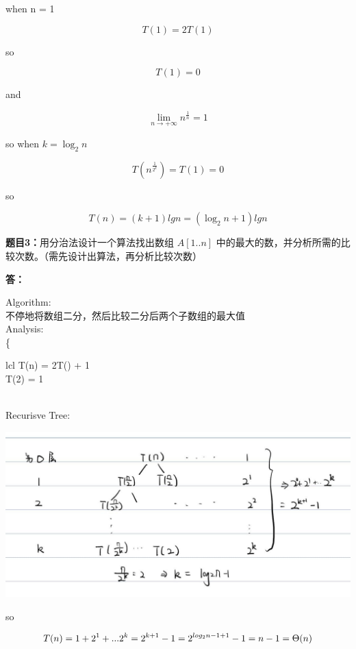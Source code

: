 \documentclass[12pt,a4paper]{article}
\begin{document}
\begin{CJK*}{UTF8}{gbsn}
when n = 1

$$T(1) = 2T(1)$$

so 

$$T(1) = 0$$

and 

$$\lim_{n \to +\infty} n^{\frac{1}{n}} = 1$$

so when $k = \log_2n$

$$T(n^{\frac{1}{2^k}}) = T(1) = 0$$

so 

$$T(n) = (k+1)lgn = (\log_2n+1)lgn$$

\vspace{10pt}
\noindent
{\bf 题目3：}用分治法设计一个算法找出数组 $A[1..n]$ 中的最大的数，并分析所需的比较次数。（需先设计出算法，再分析比较次数）

\vspace{5pt}
\noindent
{\bf 答：}

Algorithm:\\

不停地将数组二分，然后比较二分后两个子数组的最大值\\

Analysis:\\

\left\{\begin{array}{lcl}
		T(n) = 2T() + 1\\
		T(2) = 1
	\end{array}\right\\

Recurisve Tree:

\includegraphics[width=15cm]{pic_hw3.jpg}

so

$$
T(n) = 1 + 2^1 + ... 2^k = 2^{k+1} -1\\
= 2^{log_2n - 1 + 1} -1 = n -1 = \Theta(n)
$$

\end{CJK*}
\end{document}
